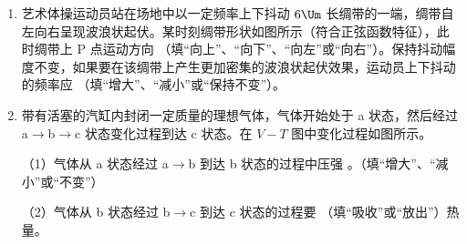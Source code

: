 \documentclass[\gkver]{gaokaozhenti}
\begin{document}
\begin{enumerate}
{联立解得

$I=\left(\frac{F}{v}\right)\left(\frac{q}{m}\right)\approx3.7\UA$

故 C 错误。

故选 AD。
}

\item
艺术体操运动员站在场地中以一定频率上下抖动 $6\Um$ 长绸带的一端，绸带自左向右呈现波浪状起伏。某时刻绸带形状如图所示（符合正弦函数特征），此时绸带上 P 点运动方向 （填“向上”、“向下”、“向左”或“向右”）。保持抖动幅度不变，如果要在该绸带上产生更加密集的波浪状起伏效果，运动员上下抖动的频率应 （填“增大”、“减小”或“保持不变”）。



\item
带有活塞的汽缸内封闭一定质量的理想气体，气体开始处于 a 状态，然后经过 a$\to$b$\to$c 状态变化过程到达 c 状态。在 $V-T$ 图中变化过程如图所示。

（1）气体从 a 状态经过 a$\to$b 到达 b 状态的过程中压强 。（填“增大”、“减小”或“不变”）

（2）气体从 b 状态经过 b$\to$c 到达 c 状态的过程要 （填“吸收”或“放出”）热量。




\end{enumerate}
\end{document}
